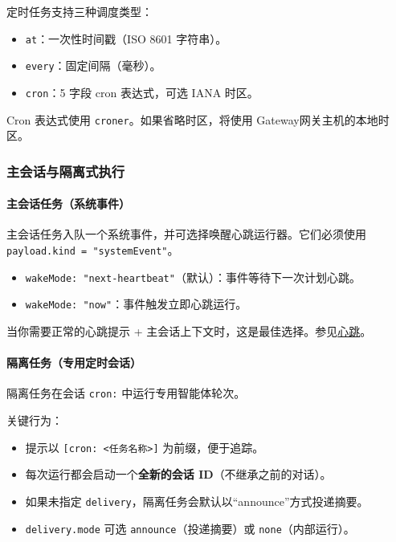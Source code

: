 定时任务支持三种调度类型：

\begin{itemize}
  \item \texttt{at}：一次性时间戳（ISO 8601 字符串）。
  \item \texttt{every}：固定间隔（毫秒）。
  \item \texttt{cron}：5 字段 cron 表达式，可选 IANA 时区。
\end{itemize}


Cron 表达式使用 \texttt{croner}。如果省略时区，将使用 Gateway网关主机的本地时区。

\subsubsection{主会话与隔离式执行}


\paragraph{主会话任务（系统事件）}


主会话任务入队一个系统事件，并可选择唤醒心跳运行器。它们必须使用 \texttt{payload.kind = "systemEvent"}。

\begin{itemize}
  \item \texttt{wakeMode: "next-heartbeat"}（默认）：事件等待下一次计划心跳。
  \item \texttt{wakeMode: "now"}：事件触发立即心跳运行。
\end{itemize}


当你需要正常的心跳提示 + 主会话上下文时，这是最佳选择。参见\href{/gateway/heartbeat}{心跳}。

\paragraph{隔离任务（专用定时会话）}


隔离任务在会话 \texttt{cron:} 中运行专用智能体轮次。

关键行为：

\begin{itemize}
  \item 提示以 \texttt{[cron: <任务名称>]} 为前缀，便于追踪。
  \item 每次运行都会启动一个\textbf{全新的会话 ID}（不继承之前的对话）。
  \item 如果未指定 \texttt{delivery}，隔离任务会默认以“announce”方式投递摘要。
  \item \texttt{delivery.mode} 可选 \texttt{announce}（投递摘要）或 \texttt{none}（内部运行）。
\end{itemize}


